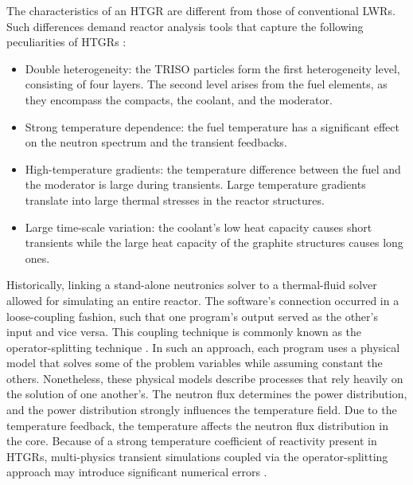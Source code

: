 The characteristics of an \gls{HTGR} are different from those of conventional \glspl{LWR}.
Such differences demand reactor analysis tools that capture the following peculiarities of \glspl{HTGR} \cite{rohde_development_2012}\cite{bostelmann_criticality_2016}:
\begin{itemize}
\item Double heterogeneity: the TRISO particles form the first heterogeneity level, consisting of four
layers.
The second level arises from the fuel elements, as they encompass the compacts, the coolant, and the moderator.
\item Strong temperature dependence: the fuel temperature has a significant effect on the neutron spectrum and the transient feedbacks.
\item High-temperature gradients: the temperature difference between the fuel and the moderator is large during transients.
Large temperature gradients translate into large thermal stresses in the reactor structures.
\item Large time-scale variation: the coolant's low heat capacity causes short transients while the large heat capacity of the graphite structures causes long ones.
\end{itemize}

Historically, linking a stand-alone neutronics solver to a thermal-fluid solver allowed for simulating an entire reactor.
The software's connection occurred in a loose-coupling fashion, such that one program's output served as the other's input and vice versa.
This coupling technique is commonly known as the operator-splitting technique \cite{ragusa_consistent_2009}.
In such an approach, each program uses a physical model that solves some of the problem variables while assuming constant the others.
Nonetheless, these physical models describe processes that rely heavily on the solution of one another's.
The neutron flux determines the power distribution, and the power distribution strongly influences the temperature field.
Due to the temperature feedback, the temperature affects the neutron flux distribution in the core.
Because of a strong temperature coefficient of reactivity present in HTGRs, multi-physics transient simulations coupled via the operator-splitting approach may introduce significant numerical errors \cite{park_tightly_2010}\cite{ragusa_consistent_2009}.

